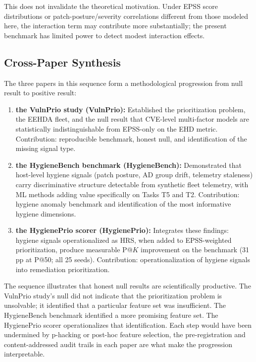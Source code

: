 This does not invalidate the theoretical motivation. Under EPSS score distributions or patch-posture/severity correlations different from those modeled here, the interaction term may contribute more substantially; the present benchmark has limited power to detect modest interaction effects.

\subsection{Cross-Paper Synthesis}

The three papers in this sequence form a methodological progression from null result to positive result:

\begin{enumerate}
 \item \textbf{the VulnPrio study (VulnPrio):} Established the prioritization problem, the EEHDA fleet, and the null result that CVE-level multi-factor models are statistically indistinguishable from EPSS-only on the EHD metric. Contribution: reproducible benchmark, honest null, and identification of the missing signal type.
 \item \textbf{the HygieneBench benchmark (HygieneBench):} Demonstrated that host-level hygiene signals (patch posture, AD group drift, telemetry staleness) carry discriminative structure detectable from synthetic fleet telemetry, with ML methods adding value specifically on Tasks T5 and T2. Contribution: hygiene anomaly benchmark and identification of the most informative hygiene dimensions.
 \item \textbf{the HygienePrio scorer (HygienePrio):} Integrates these findings: hygiene signals operationalized as HRS, when added to EPSS-weighted prioritization, produce measurable P@$K$ improvement on the benchmark (31 pp at P@50; all 25 seeds). Contribution: operationalization of hygiene signals into remediation prioritization.
\end{enumerate}

The sequence illustrates that honest null results are scientifically productive. The VulnPrio study's null did not indicate that the prioritization problem is unsolvable; it identified that a particular feature set was insufficient. The HygieneBench benchmark identified a more promising feature set. The HygienePrio scorer operationalizes that identification. Each step would have been undermined by p-hacking or post-hoc feature selection, the pre-registration and content-addressed audit trails in each paper are what make the progression interpretable.

